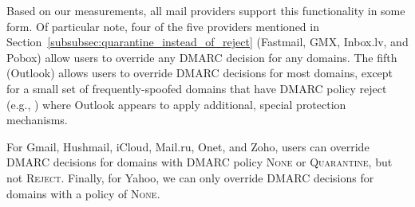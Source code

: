 Based on our measurements, all mail providers support this functionality in some form.
Of particular note, four of the five providers 
mentioned in Section~\ref{subsubsec:quarantine_instead_of_reject}
(Fastmail, GMX, Inbox.lv, and Pobox)
allow users to override any DMARC decision for any domains.
The fifth (Outlook) allows users to override DMARC decisions for most domains, except for a small set of frequently-spoofed domains that have DMARC policy reject (e.g., ) where Outlook appears to apply additional, special protection mechanisms.

For Gmail, Hushmail, iCloud, Mail.ru, Onet, and Zoho, users can override DMARC decisions for domains with DMARC policy \textsc{None} or \textsc{Quarantine}, but not \textsc{Reject}.  Finally, for Yahoo, we can only override DMARC decisions for domains with a policy of \textsc{None}.











